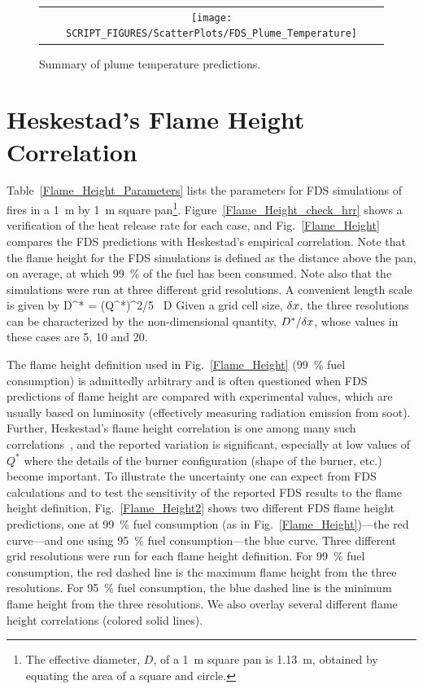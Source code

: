 \begin{figure}[h!]
\begin{center}
\begin{tabular}{c}
\texttt{[image: SCRIPT\_FIGURES/ScatterPlots/FDS\_Plume\_Temperature]}
\end{tabular}
\end{center}
\caption[Summary of plume temperature predictions]
{Summary of plume temperature predictions.}
\label{Plume_Summary}
\end{figure}

\clearpage


\section{Heskestad's Flame Height Correlation}

Table~\ref{Flame_Height_Parameters} lists the parameters for FDS simulations of fires in a 1~m by 1~m square pan\footnote{The effective diameter, $D$, of a 1~m square pan is 1.13~m, obtained by equating the area of a square and circle.}. Figure~\ref{Flame_Height_check_hrr} shows a verification of the heat release rate for each case, and Fig.~\ref{Flame_Height} compares the FDS predictions with Heskestad's empirical correlation. Note that the flame height for the FDS simulations is defined as the distance above the pan, on average, at which 99~\% of the fuel has been consumed. Note also that the simulations were run at three different grid resolutions. A convenient length scale is given by
\be
   D^* = (Q^*)^{2/5} \, D
\ee
Given a grid cell size, $\delta x$, the three resolutions can be characterized by the non-dimensional quantity, $D^*/\delta x$, whose values in these cases are 5, 10 and 20.

The flame height definition used in Fig.~\ref{Flame_Height} (99~\% fuel consumption) is admittedly arbitrary and is often questioned when FDS predictions of flame height are compared with experimental values, which are usually based on luminosity (effectively measuring radiation emission from soot).  Further, Heskestad's flame height correlation is one among many such correlations~\cite{SFPE:Heskestad,Steward:1970,Becker:1978,Cox:1985,Hasemi:1984,Cetegen:1984,Delichatsios:1984}, and the reported variation is significant, especially at low values of $Q^*$ where the details of the burner configuration (shape of the burner, etc.) become important.  To illustrate the uncertainty one can expect from FDS calculations and to test the sensitivity of the reported FDS results to the flame height definition, Fig.~\ref{Flame_Height2} shows two different FDS flame height predictions, one at 99~\% fuel consumption (as in Fig.~\ref{Flame_Height})---the red curve---and one using 95~\% fuel consumption---the blue curve.  Three different grid resolutions were run for each flame height definition.  For 99~\% fuel consumption, the red dashed line is the maximum flame height from the three resolutions.  For 95~\% fuel consumption, the blue dashed line is the minimum flame height from the three resolutions.  We also overlay several different flame height correlations (colored solid lines).

